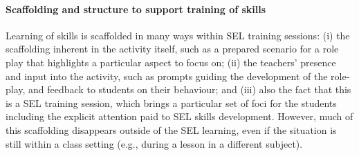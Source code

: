 \documentclass[prodmode,acmtochi]{acmsmall}
\newcommand{\rephrase}[1]{\textrm{\textrm{\textcolor{gray}{#1}}}}
\begin{document}





\paragraph{Scaffolding and structure to support training of skills}
Learning of skills is scaffolded in many ways within SEL training sessions:  (i) the scaffolding inherent in the activity itself, such as a prepared scenario for a role play that highlights a particular aspect to focus on; (ii) the teachers' presence and input into the activity, such as prompts guiding the development of the role-play, and feedback to students on their behaviour; and (iii) also the fact that this is a SEL training session, which brings a particular set of foci for the students including the explicit attention paid to SEL skills development. However, much of this scaffolding disappears outside of the SEL learning, even if the situation is still within a class setting (e.g., during a lesson in a different subject). 

\end{document}
